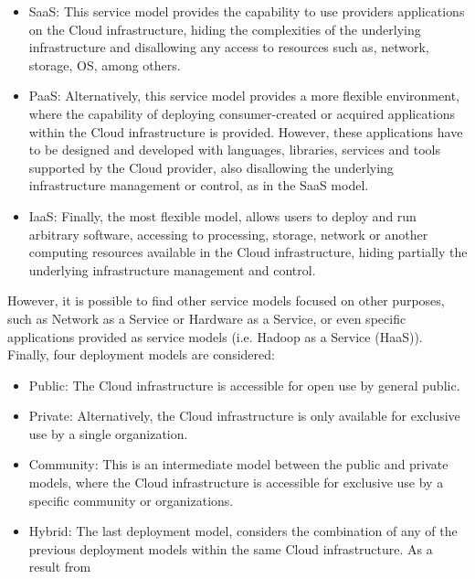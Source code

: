 \begin{itemize}
\item SaaS: This service model provides the capability to use providers applications
on the Cloud infrastructure, hiding the complexities of the
underlying infrastructure and disallowing any access to resources such
as, network, storage, OS, among others.
\item PaaS: Alternatively, this service model provides a more flexible environment,
where the capability of deploying consumer-created or acquired
applications within the Cloud infrastructure is provided. However,
these applications have to be designed and developed with languages,
libraries, services and tools supported by the Cloud provider,
also disallowing the underlying infrastructure management or control,
as in the SaaS model.
\item IaaS: Finally, the most flexible model, allows users to deploy and run
arbitrary software, accessing to processing, storage, network or another 
computing resources available in the Cloud infrastructure, hiding partially
the underlying infrastructure management and control.
\end{itemize}

However, it is possible to find other service models focused on other purposes,
such as Network as a Service or Hardware as a Service, or even specific
applications provided as service models (i.e. Hadoop as a Service (HaaS)).
Finally, four deployment models are considered:
\begin{itemize}
\item Public: The Cloud infrastructure is accessible for open use by general
public.
\item Private: Alternatively, the Cloud infrastructure is only available for
exclusive use by a single organization.
\item Community: This is an intermediate model between the public and
private models, where the Cloud infrastructure is accessible for exclusive
use by a specific community or organizations.
\item Hybrid: The last deployment model, considers the combination of any
of the previous deployment models within the same Cloud infrastructure.
As a result from
\end{itemize}


